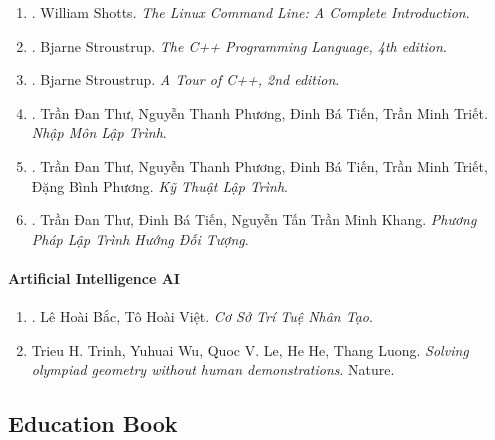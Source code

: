 \documentclass{article}
\begin{document}
\begin{enumerate}
	\item \cite{Shotts2019}. {\sc William Shotts}. {\it The Linux Command Line: A Complete Introduction}.\hfill{\sf[reading]}
	
	\item \cite{Stroustrup2013}. {\sc Bjarne Stroustrup}. {\it The C++ Programming Language, 4th edition}.\hfill{\sf[reading]}
	
	\item \cite{Stroustrup2018}. Bjarne Stroustrup. {\it A Tour of C++, 2nd edition}.\hfill{\sf[reading]}
	
	\item \cite{Thu_Phuong_Tien_Triet_NMLT}. Trần Đan Thư, Nguyễn Thanh Phương, Đinh Bá Tiến, Trần Minh Triết. {\it Nhập Môn Lập Trình}.\hfill{\sf[reading]}
	
	\item \cite{Thu_Phuong_Tien_Triet_Phuong_KTLT}. Trần Đan Thư, Nguyễn Thanh Phương, Đinh Bá Tiến, Trần Minh Triết, Đặng Bình Phương. {\it Kỹ Thuật Lập Trình}.\hfill{\sf[reading]}
	
	\item \cite{Thu_Tien_Khang_PPLTHDT}. Trần Đan Thư, Đinh Bá Tiến, Nguyễn Tấn Trần Minh Khang. {\it Phương Pháp Lập Trình Hướng Đối Tượng}.\hfill{\sf[reading]}
\end{enumerate}

\paragraph{Artificial Intelligence AI}

\begin{enumerate}
	\item \cite{Bac_Viet_AI}. Lê Hoài Bắc, Tô Hoài Việt. {\it Cơ Sở Trí Tuệ Nhân Tạo}.\hfill{\sf[done]}
	
	\item Trieu H. Trinh, Yuhuai Wu, Quoc V. Le, He He, Thang Luong. {\it Solving olympiad geometry without human demonstrations}. Nature.\hfill{\sf[reading]}
\end{enumerate}


\subsection{Education Book}
\end{document}
